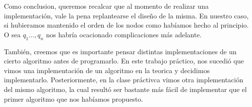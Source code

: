 Como conclusion, queremos recalcar que al momento de realizar una implementación, vale la pena replantearse el diseño de la misma. En nuestro caso, si hubieramos mantenido el orden de los nodos como habíamos hecho al principio. O sea $q_1 \dots,  q_n$ nos habría ocacionado complicaciones más adelante.

 
También, creemos que es importante pensar distintas implementaciones de un cierto algoritmo antes de programarlo. En este trabajo práctico, nos sucedió que vimos una implementación de un algoritmo en la teorica y decidimos implementarlo. Posteriormente, en la clase práctivca vimos otra implementación del mismo algoritmo, la cual resultó ser bastante más fácil de implementar que el primer algoritmo que nos habíamos propuesto.
